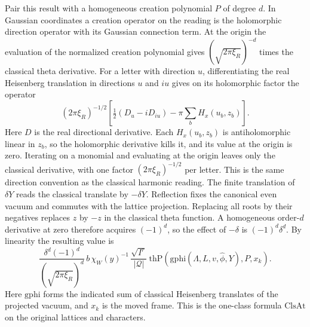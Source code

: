 Pair this result with a homogeneous creation polynomial $P$ of degree
$d$. In Gaussian coordinates a creation operator on the reading is
the holomorphic direction operator with its Gaussian connection
term. At the origin the evaluation of the normalized creation
polynomial gives $(\sqrt{2\pi\xi_R})^{-d}$ times the classical
theta derivative. For a letter with direction $u$, differentiating the real
Heisenberg translation in directions $u$ and $iu$ gives on its
holomorphic factor the operator
\[
 (2\pi\xi_R)^{-1/2}\!
 \left[\tfrac12(D_u-iD_{iu})
            -\pi\sum_b H_x(u_b,z_b)\right].
\]
Here $D$ is the real directional derivative. Each $H_x(u_b,z_b)$
is antiholomorphic linear in $z_b$, so the holomorphic derivative
kills it, and its value at the origin is zero. Iterating on a
monomial and evaluating at the origin leaves only the classical
derivative, with one factor $(2\pi\xi_R)^{-1/2}$ per letter.
This is the same direction convention as the
classical harmonic reading. The finite translation of $\delta Y$
reads the classical translate by $-\delta Y$. Reflection fixes the
canonical even vacuum and commutes with the lattice projection.
Replacing all roots by their negatives replaces $z$ by $-z$ in the
classical theta function. A homogeneous order-$d$ derivative at zero
therefore acquires $(-1)^d$, so the effect of $-\delta$ is
$(-1)^d\delta^d$. By linearity the resulting value is
\[
 \frac{\delta^d(-1)^d}{(\sqrt{2\pi\xi_R})^d}\,
 b\,\chi_W(y)^{-1}\,\frac{\sqrt{I^r}}{|\mathcal Q|}
 \ \mathrm{thP}\!\left(
    \mathrm{gphi}(\Lambda,L,v,\widehat\phi,Y),P,x_k\right).
\]
Here $\mathrm{gphi}$ forms the indicated sum of classical
Heisenberg translates of the projected vacuum, and $x_k$ is the
moved frame. This is the one-class formula $\mathrm{ClsAt}$ on
the original lattices and characters.

